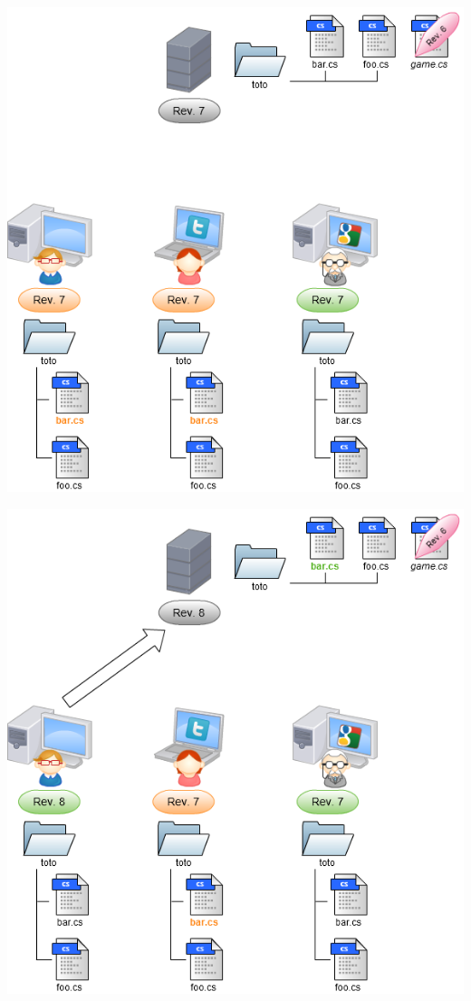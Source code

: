 \begin{frame}
  \begin{center}
    \includegraphics[scale=0.3]{images/12-Work.png}
  \end{center}
\end{frame}

\begin{frame}
  \begin{center}
    \includegraphics[scale=0.3]{images/13-Commit4.png}
  \end{center}
\end{frame}

